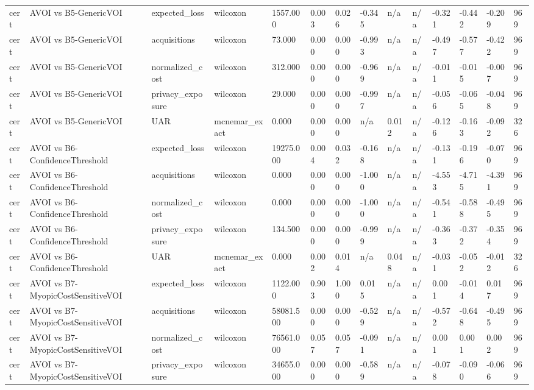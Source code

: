 \begin{table}[!ht]
{\begin{tabular}{llllllllllllll}
cert & AVOI vs B5-GenericVOI & expected\_loss & wilcoxon & 1557.000 & 0.003 & 0.026 & -0.345 & n/a & n/a & -0.321 & -0.442 & -0.209 & 969 \\
cert & AVOI vs B5-GenericVOI & acquisitions & wilcoxon & 73.000 & 0.000 & 0.000 & -0.993 & n/a & n/a & -0.497 & -0.577 & -0.422 & 969 \\
cert & AVOI vs B5-GenericVOI & normalized\_cost & wilcoxon & 312.000 & 0.000 & 0.000 & -0.969 & n/a & n/a & -0.011 & -0.015 & -0.007 & 969 \\
cert & AVOI vs B5-GenericVOI & privacy\_exposure & wilcoxon & 29.000 & 0.000 & 0.000 & -0.997 & n/a & n/a & -0.056 & -0.065 & -0.048 & 969 \\
cert & AVOI vs B5-GenericVOI & UAR & mcnemar\_exact & 0.000 & 0.000 & 0.000 & n/a & 0.012 & n/a & -0.126 & -0.163 & -0.092 & 326 \\
cert & AVOI vs B6-ConfidenceThreshold & expected\_loss & wilcoxon & 19275.000 & 0.004 & 0.032 & -0.168 & n/a & n/a & -0.131 & -0.196 & -0.070 & 969 \\
cert & AVOI vs B6-ConfidenceThreshold & acquisitions & wilcoxon & 0.000 & 0.000 & 0.000 & -1.000 & n/a & n/a & -4.553 & -4.715 & -4.391 & 969 \\
cert & AVOI vs B6-ConfidenceThreshold & normalized\_cost & wilcoxon & 0.000 & 0.000 & 0.000 & -1.000 & n/a & n/a & -0.541 & -0.588 & -0.495 & 969 \\
cert & AVOI vs B6-ConfidenceThreshold & privacy\_exposure & wilcoxon & 134.500 & 0.000 & 0.000 & -0.999 & n/a & n/a & -0.363 & -0.372 & -0.354 & 969 \\
cert & AVOI vs B6-ConfidenceThreshold & UAR & mcnemar\_exact & 0.000 & 0.002 & 0.014 & n/a & 0.048 & n/a & -0.031 & -0.052 & -0.012 & 326 \\
cert & AVOI vs B7-MyopicCostSensitiveVOI & expected\_loss & wilcoxon & 1122.000 & 0.903 & 1.000 & 0.015 & n/a & n/a & 0.001 & -0.014 & 0.017 & 969 \\
cert & AVOI vs B7-MyopicCostSensitiveVOI & acquisitions & wilcoxon & 58081.500 & 0.000 & 0.000 & -0.529 & n/a & n/a & -0.572 & -0.648 & -0.495 & 969 \\
cert & AVOI vs B7-MyopicCostSensitiveVOI & normalized\_cost & wilcoxon & 76561.000 & 0.057 & 0.057 & -0.091 & n/a & n/a & 0.001 & 0.001 & 0.002 & 969 \\
cert & AVOI vs B7-MyopicCostSensitiveVOI & privacy\_exposure & wilcoxon & 34655.000 & 0.000 & 0.000 & -0.589 & n/a & n/a & -0.078 & -0.090 & -0.066 & 969 \\

\end{tabular}}
\end{table}
